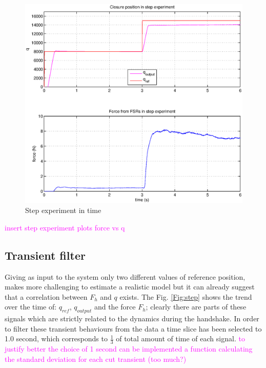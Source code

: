 \begin{figure}[h]
\includegraphics[width=\textwidth]{Figure/step.eps}
  \caption{Step experiment in time}
  \label{fig:step}
\end{figure}

\textcolor{magenta}{insert step experiment plots force vs q}
\subsection{Transient filter}\label{sec:transient}
Giving as input to the system only two different values of reference position, makes more challenging to estimate a realistic model but it can already suggest that a correlation between $F_{h}$ and $q$ exists.
The Fig. \ref{Fig:step} shows the trend over the time of: $q_{ref}$, $q_{output}$ and the force $F_{h}$; clearly there are parts of these signals which are strictly related to the dynamics during the handshake. 
In order to filter these transient behaviours from the data a time slice has been selected to 1.0 second, which corresponds to $\frac{1}{3}$ of total amount of time of each signal.
\textcolor{magenta}{to justify better the choice of 1 second can be implemented a function calculating the standard deviation for each cut transient (too much?)}



